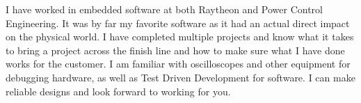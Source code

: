 \documentclass[letter,12pt]{article}
\begin{document}
I have worked in embedded software at both Raytheon and Power Control Engineering. It was by far my favorite software as it had an actual direct impact on the physical world. I have completed multiple projects and know what it takes to bring a project across the finish line and how to make sure what I have done works for the customer. I am familiar with oscilloscopes and other equipment for debugging hardware, as well as Test Driven Development for software. I can make reliable designs and look forward to working for you.
\end{document}
